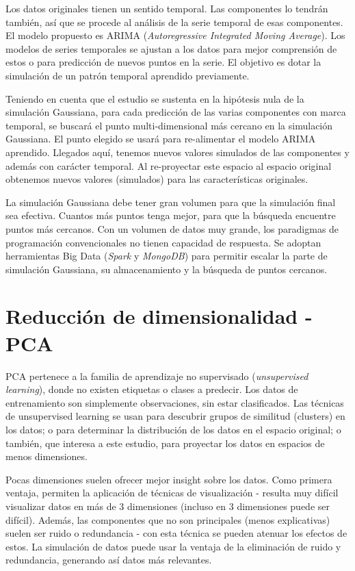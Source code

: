 \documentclass[11pt,spanish,listoffigures,listoftables]{tfgetsinf}
\begin{document}
Los datos originales tienen un sentido temporal. Las componentes lo tendrán también, así que se procede al análisis de la serie temporal de esas componentes. El modelo propuesto es ARIMA ({\em Autoregressive Integrated Moving Average}). Los modelos de series temporales se ajustan a los datos para mejor comprensión de estos o para predicción de nuevos puntos en la serie. El objetivo es dotar la simulación de un patrón temporal aprendido previamente.

Teniendo en cuenta que el estudio se sustenta en la hipótesis nula de la simulación Gaussiana, para cada predicción de las varias componentes con marca temporal, se buscará el punto multi-dimensional más cercano en la simulación Gaussiana. El punto elegido se usará para re-alimentar el modelo ARIMA aprendido. Llegados aquí, tenemos nuevos valores simulados de las componentes y además con carácter temporal. Al re-proyectar este espacio al espacio original obtenemos nuevos valores (simulados) para las características originales.

La simulación Gaussiana debe tener gran volumen para que la simulación final sea efectiva. Cuantos más puntos tenga mejor, para que la búsqueda encuentre puntos más cercanos. Con un volumen de datos muy grande, los paradigmas de programación convencionales no tienen capacidad de respuesta. Se adoptan herramientas Big Data ({\em Spark} y {\em MongoDB}) para permitir escalar la parte de simulación Gaussiana, su almacenamiento y la búsqueda de puntos cercanos.


    \section{Reducción de dimensionalidad - PCA}
    PCA pertenece a la familia de aprendizaje no supervisado ({\em unsupervised learning}), donde no existen etiquetas o clases a predecir. Los datos de entrenamiento son simplemente observaciones, sin estar clasificados. Las técnicas de unsupervised learning se usan para descubrir grupos de similitud (clusters) en los datos; o para determinar la distribución de los datos en el espacio original; o también, que interesa a este estudio, para proyectar los datos en espacios de menos dimensiones.

    Pocas dimensiones suelen ofrecer mejor insight sobre los datos. Como primera ventaja, permiten la aplicación de técnicas de visualización - resulta muy difícil visualizar datos en más de 3 dimensiones (incluso en 3 dimensiones puede ser difícil). Además, las componentes que no son principales (menos explicativas) suelen ser ruido o redundancia - con esta técnica se pueden atenuar los efectos de estos. La simulación de datos puede usar la ventaja de la eliminación de ruido y redundancia, generando así datos más relevantes.
    
\end{document}
